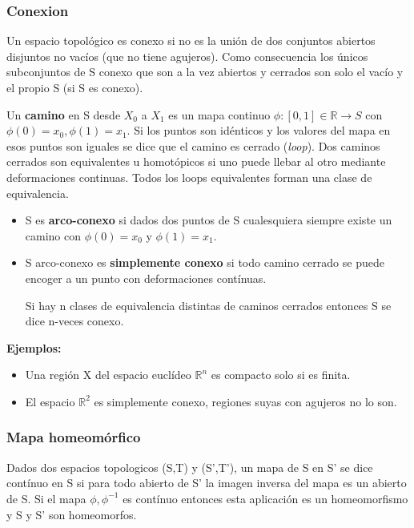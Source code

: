 \subsubsection{Conexion}

Un espacio topológico es conexo si no es la unión de dos conjuntos abiertos disjuntos no vacíos (que no tiene agujeros). Como consecuencia los únicos subconjuntos de S conexo que son a la vez abiertos y cerrados son solo el vacío y el propio S (si S es conexo).

\smallskip
Un \textbf{camino} en S desde $X_0$ a $X_1$  es un mapa continuo  $\phi: [0,1]\in \mathds{R}\to S$ con $\phi (0)=x_0,\phi (1)=x_1$. Si los puntos son idénticos y los valores del mapa en esos puntos son iguales se dice que el camino es cerrado (\textit{loop}). Dos caminos cerrados son equivalentes u homotópicos si uno puede llebar al otro mediante deformaciones continuas. Todos los loops equivalentes forman una clase de equivalencia.

\begin{itemize}
\item S es \textbf{arco-conexo} si dados dos puntos de S cualesquiera siempre existe un camino con $\phi (0)=x_0$ y $\phi (1)=x_1$.

\item S arco-conexo es \textbf{simplemente conexo} si todo camino cerrado se puede encoger a un punto con deformaciones contínuas.

Si hay n clases de equivalencia distintas de caminos cerrados entonces S se dice n-veces conexo.
\end{itemize}

\textbf{Ejemplos:}

\begin{itemize}
\item Una región X del espacio euclídeo $\mathds{R}^n$ es compacto solo si es finita.
\item El espacio $\mathds{R}^2$ es simplemente conexo, regiones suyas con agujeros no lo son.
\end{itemize}

\subsubsection{Mapa homeomórfico}

Dados dos espacios topologicos (S,T) y (S',T'), un mapa de S en S' se dice contínuo en S si para todo abierto de S' la imagen inversa del mapa es un abierto de S. Si el mapa $\phi , \phi ^{-1}$ es contínuo entonces esta aplicación es un homeomorfismo y S y S' son homeomorfos.

